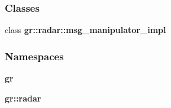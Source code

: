 \subsubsection*{Classes}
\begin{DoxyCompactItemize}
\item 
class {\bf gr\+::radar\+::msg\+\_\+manipulator\+\_\+impl}
\end{DoxyCompactItemize}
\subsubsection*{Namespaces}
\begin{DoxyCompactItemize}
\item 
 {\bf gr}
\item 
 {\bf gr\+::radar}
\end{DoxyCompactItemize}
